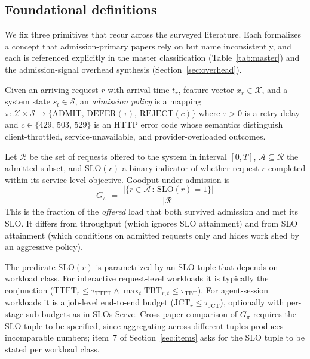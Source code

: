 \subsection{Foundational definitions}
\label{sec:defs}

We fix three primitives that recur across the surveyed literature.
Each formalizes a concept that admission-primary papers rely on but
name inconsistently, and each is referenced explicitly in the master
classification (Table~\ref{tab:master}) and the admission-signal
overhead synthesis (Section~\ref{sec:overhead}).

\begin{definition}
\label{def:admission}
Given an arriving request $r$ with arrival time $t_r$, feature vector
$x_r \in \mathcal{X}$, and a system state
$s_t \in \mathcal{S}$, an \emph{admission policy} is a mapping
$\pi : \mathcal{X} \times \mathcal{S} \to \{\mathrm{ADMIT},\,
\mathrm{DEFER}(\tau),\, \mathrm{REJECT}(c)\}$ where $\tau > 0$ is a
retry delay and $c \in \{429,\,503,\,529\}$ is an HTTP error code
whose semantics distinguish client-throttled, service-unavailable, and
provider-overloaded outcomes.
\end{definition}

\begin{definition}
\label{def:goodput}
Let $\mathcal{R}$ be the set of requests offered to the system in
interval $[0, T]$, $\mathcal{A} \subseteq \mathcal{R}$ the admitted
subset, and $\mathrm{SLO}(r)$ a binary indicator of whether request $r$
completed within its service-level objective. Goodput-under-admission
is
%
\begin{equation}
G_\pi \;=\; \frac{|\{r \in \mathcal{A}\,:\,\mathrm{SLO}(r) = 1\}|}{|\mathcal{R}|}
\label{eq:goodput}
\end{equation}
%
This is the fraction of the \emph{offered} load that both survived
admission and met its SLO. It differs from throughput (which ignores
SLO attainment) and from SLO attainment (which conditions on admitted
requests only and hides work shed by an aggressive policy).

The predicate $\mathrm{SLO}(r)$ is parametrized by an SLO tuple that
depends on workload class. For interactive request-level workloads it
is typically the conjunction ($\mathrm{TTFT}_r \le \tau_{\text{TTFT}}
\wedge \max_t \mathrm{TBT}_{r,t} \le \tau_{\text{TBT}}$). For
agent-session workloads it is a job-level end-to-end budget
($\mathrm{JCT}_r \le \tau_{\text{JCT}}$), optionally with per-stage
sub-budgets as in SLOs-Serve. Cross-paper comparison of
$G_\pi$ requires the SLO tuple to be specified, since aggregating
across different tuples produces incomparable numbers; item~7 of
Section~\ref{sec:items} asks for the SLO tuple to be stated per
workload class.
\end{definition}

